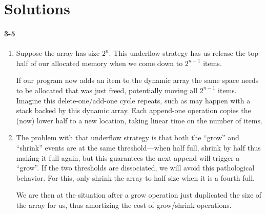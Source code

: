 \documentclass{report}
\begin{document}
\section*{Solutions}

\paragraph{3-5}
\begin{enumerate}[label=\alph*)]
	\item Suppose the array has size $2^n$. This underflow strategy has us release the top half of our allocated memory when we come down to $2^{n-1}$ items.
        \begin{center}
        \end{center}
        If our program now adds an item to the dynamic array the same space needs to be allocated that was just freed, potentially moving all $2^{n-1}$ items. Imagine this delete-one/add-one cycle repeats, such as may happen with a stack backed by this dynamic array. Each append-one operation copies the (now) lower half to a new location, taking linear time on the number of items.

	\item The problem with that underflow strategy is that both the ``grow'' and ``shrink'' events are at the same threshold---when half full, shrink by half thus making it full again, but this guarantees the next append will trigger a ``grow''. If the two thresholds are dissociated, we will avoid this pathological behavior. For this, only shrink the array to half size when it is a fourth full.
        \begin{center}
        \end{center}
        We are then at the situation after a grow operation just duplicated the size of the array for us, thus amortizing the cost of grow/shrink operations.
\end{enumerate}
\end{document}
